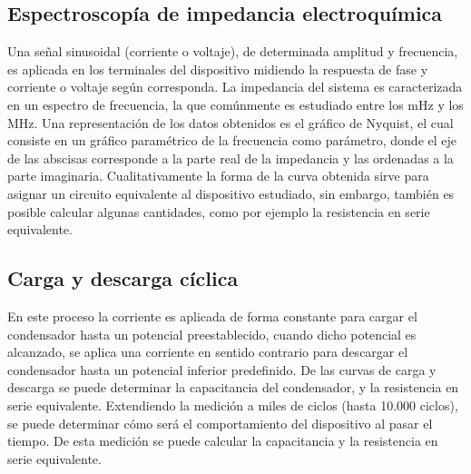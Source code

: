 \subsection{Espectroscopía de impedancia electroquímica}
Una señal sinusoidal (corriente o voltaje), de determinada amplitud y frecuencia, es aplicada en los terminales del dispositivo midiendo la respuesta de fase y corriente o voltaje según corresponda. La impedancia del sistema es caracterizada en un espectro de frecuencia, la que comúnmente es estudiado entre los mHz y los MHz. Una representación de los datos obtenidos es el gráfico de Nyquist, el cual consiste en un gráfico paramétrico de la frecuencia como parámetro, donde el eje de las abscisas corresponde a la parte real de la impedancia y las ordenadas a la parte imaginaria. Cualitativamente la forma de la curva obtenida sirve para asignar un circuito equivalente al dispositivo estudiado, sin embargo, también es posible calcular algunas cantidades, como por ejemplo la resistencia en serie equivalente.

\subsection{Carga y descarga cíclica}
En este proceso la corriente es aplicada de forma constante para cargar el condensador hasta un potencial preestablecido, cuando dicho potencial es alcanzado, se aplica una corriente en sentido contrario para descargar el condensador hasta un potencial inferior predefinido. De las curvas de carga y descarga se puede determinar la capacitancia del condensador, y la resistencia en serie equivalente. Extendiendo la medición a miles de ciclos (hasta 10.000 ciclos), se puede determinar cómo será el comportamiento del dispositivo al pasar el tiempo.
De esta medición se puede calcular la capacitancia y la resistencia en serie equivalente.